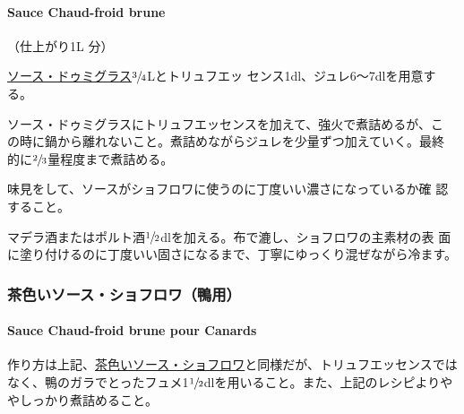 \documentclass[twoside,12Q,b5j]{escoffierltjsbook}
\newenvironment{recette}{\begin{small}\begin{spacing}{1}\begin{multicols}{2}}{\end{multicols}\end{spacing}\end{small}}
\begin{document}
\begin{recette}
\hypertarget{sauce-chaud-froid-brune}{\paragraph{Sauce Chaud-froid
brune}\label{sauce-chaud-froid-brune}}


（仕上がり1L 分）

\protect\hyperlink{sauce-demi-glace}{ソース・ドゥミグラス}\(\sfrac{3}{4}\)Lとトリュフエッ
センス1dl、ジュレ6〜7dlを用意する。

ソース・ドゥミグラスにトリュフエッセンスを加えて、強火で煮詰めるが、こ
の時に鍋から離れないこと。煮詰めながらジュレを少量ずつ加えていく。最終
的に\(\sfrac{2}{3}\)量程度まで煮詰める。

味見をして、ソースがショフロワに使うのに丁度いい濃さになっているか確
認すること。

マデラ酒またはポルト酒\(\sfrac{1}{2}\)dlを加える。布で漉し、ショフロワの主素材の表
面に塗り付けるのに丁度いい固さになるまで、丁寧にゆっくり混ぜながら冷ます。

\vspace*{1.7\zw}

\subsubsection{茶色いソース・ショフロワ（鴨用）}\label{ux8336ux8272ux3044ux30bdux30fcux30b9ux30b7ux30e7ux30d5ux30edux30efux9d28ux7528}

\paragraph{Sauce Chaud-froid brune pour
Canards}\label{sauce-chaud-froid-brune-pour-canards}


作り方は上記、\protect\hyperlink{sauce-chaud-froid-brune}{茶色いソース・ショフロワ}と同様だが、トリュフエッセンスではなく、鴨のガラでとったフュメ1\(\sfrac{1}{2}\)dlを用いること。また、上記のレシピよりややしっかり煮詰めること。


\end{recette}
\end{document}
